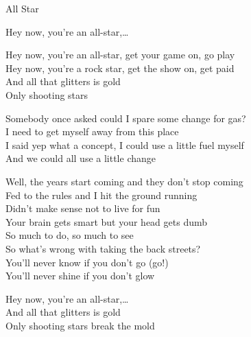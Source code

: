 \begin{song}{All Star}
  \begin{SBChorus}
    Hey now, you're an all-star,\ldots
  \end{SBChorus}

  \begin{SBChorus}
    Hey now, you're an all-star, get your game on, go play\\
    Hey now, you're a rock star, get the show on, get paid\\
    And all that glitters is gold\\
    Only shooting stars
  \end{SBChorus}

  \begin{SBSection*}
    Somebody once asked could I spare some change for gas?\\
    I need to get myself away from this place\\
    I said yep what a concept, I could use a little fuel myself\\
    And we could all use a little change
  \end{SBSection*}

  \begin{SBVerse}
    Well, the years start coming and they don't stop coming\\
    Fed to the rules and I hit the ground running\\
    Didn't make sense not to live for fun\\
    Your brain gets smart but your head gets dumb\\
    So much to do, so much to see\\
    So what's wrong with taking the back streets?\\
    You'll never know if you don't go (go!)\\
    You'll never shine if you don't glow
  \end{SBVerse}

  \begin{SBChorus}
    Hey now, you're an all-star,\ldots\\\medskip
    And all that glitters is gold\\
    Only shooting stars break the mold\\
  \end{SBChorus}
\end{song}